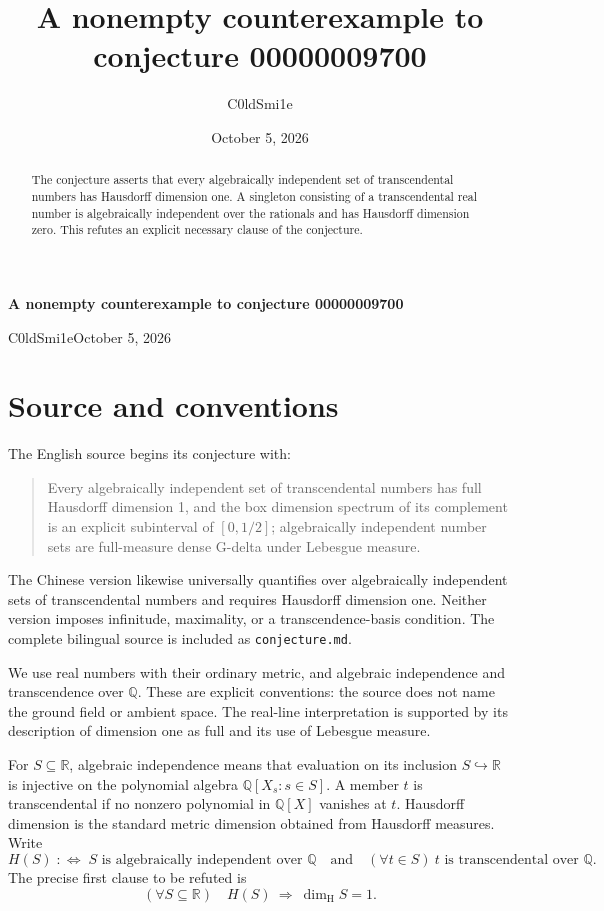 \documentclass[11pt]{article}
\title{A nonempty counterexample to conjecture 00000009700}
\author{C0ldSmi1e}
\date{October 5, 2026}
\newcommand{\Q}{\mathbb{Q}}
\newcommand{\R}{\mathbb{R}}
\newcommand{\dimH}{\dim_{\mathrm H}}
\begin{document}
\begin{center}
{\Large\bfseries A nonempty counterexample to conjecture 00000009700\par}
\vspace{0.6em}
C0ldSmi1e\qquad October 5, 2026
\end{center}
\vspace{0.3em}

\begin{abstract}
The conjecture asserts that every algebraically independent set of transcendental
numbers has Hausdorff dimension one. A singleton consisting of a transcendental
real number is algebraically independent over the rationals and has Hausdorff
dimension zero. This refutes an explicit necessary clause of the conjecture.
\end{abstract}

\section{Source and conventions}
The English source begins its conjecture with:
\begin{quote}
Every algebraically independent set of transcendental numbers has full Hausdorff
dimension 1, and the box dimension spectrum of its complement is an explicit
subinterval of $[0,1/2]$; algebraically independent number sets are full-measure
dense G-delta under Lebesgue measure.
\end{quote}
The Chinese version likewise universally quantifies over algebraically independent
sets of transcendental numbers and requires Hausdorff dimension one. Neither
version imposes infinitude, maximality, or a transcendence-basis condition.
The complete bilingual source is included as \texttt{conjecture.md}.

We use real numbers with their ordinary metric, and algebraic independence and
transcendence over $\Q$. These are explicit conventions: the source does not name
the ground field or ambient space. The real-line interpretation is supported by
its description of dimension one as full and its use of Lebesgue measure.

For $S\subseteq\R$, algebraic independence means that evaluation on its inclusion
$S\hookrightarrow\R$ is injective on the polynomial algebra
$\Q[X_s:s\in S]$. A member $t$ is transcendental if no nonzero polynomial in
$\Q[X]$ vanishes at $t$. Hausdorff dimension is the standard metric dimension
obtained from Hausdorff measures. Write
\[
  H(S)\;:\Longleftrightarrow\;
  S\text{ is algebraically independent over }\Q
  \quad\text{and}\quad
  (\forall t\in S)\ t\text{ is transcendental over }\Q.
\]
The precise first clause to be refuted is
\begin{equation}\label{eq:clause}
  (\forall S\subseteq\R)\quad H(S)\ \Longrightarrow\ \dimH S=1.
\end{equation}
\end{document}

